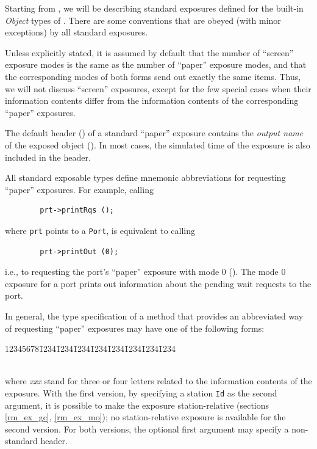 Starting from , we will be describing
standard exposures defined for the built-in
{\em Object\/} types of \smurph.
There are some conventions that are obeyed (with minor exceptions)
by all standard exposures.

Unless explicitly stated, it is assumed by default that the number of
``screen'' exposure modes is the same as the number of ``paper''
exposure modes, and that the corresponding modes of both forms send
out exactly the same items.
Thus, we will not discuss ``screen'' exposures, except for the few special
cases when their information contents differ from the information
contents of the corresponding ``paper'' exposures.

The default header ()
of a standard ``paper'' exposure contains the {\em output name\/} of the
exposed object ().
In most cases, the simulated time of the exposure is also included in the
header.

All standard exposable types define mnemonic abbreviations for requesting
``paper'' exposures.
For example, calling
\begin{verbatim}
        prt->printRqs ();
\end{verbatim}
where {\tt prt} points to a {\tt Port}, is equivalent to calling
\begin{verbatim}
        prt->printOut (0);
\end{verbatim}
i.e., to requesting the port's ``paper'' exposure with mode 0
().
The mode 0 exposure for a port prints out information about the
pending wait requests to the port.

In general, the type specification of a method that provides an abbreviated
way of requesting ``paper'' exposures may have one of the following forms:
{\tt\begin{tabbing}
12345678\=1234\=1234\=1234\=1234\=1234\=1234\=1234\=1234\kill
{}\\
\\
\end{tabbing}}
where {\em xxx\/} stand for three or four letters related to the information
contents of the exposure.
With the first version, by specifying a station {\tt Id} as
the second argument,
it is possible to make the exposure station-relative
(sections \ref{rm_ex_gc}, \ref{rm_ex_mo}); no station-relative
exposure is available for the second version.
For both versions, the optional first argument may specify a non-standard
header.

